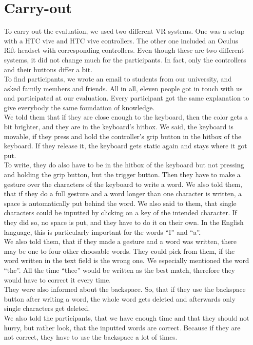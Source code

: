 \section{Carry-out}
To carry out the evaluation, we used two different VR systems. One was a setup with a HTC vive and HTC vive controllers. The other one included an Oculus Rift headset with corresponding controllers. Even though these are two different systems, it did not change much for the participants. In fact, only the controllers and their buttons differ a bit.\\
To find participants, we wrote an email to students from our university, and asked family members and friends. All in all, eleven people got in touch with us and participated at our evaluation. Every participant got the same explanation to give everybody the same foundation of knowledge.\\
We told them that if they are close enough to the keyboard, then the color gets a bit brighter, and they are in the keyboard's hitbox. We said, the keyboard is movable, if they press and hold the controller's grip button in the hitbox of the keyboard. If they release it, the keyboard gets static again and stays where it got put.\\
To write, they do also have to be in the hitbox of the keyboard but not pressing and holding the grip button, but the trigger button. Then they have to make a gesture over the characters of the keyboard to write a word. We also told them, that if they do a full gesture and a word longer than one character is written, a space is automatically put behind the word. We also said to them, that single characters could be inputted by clicking on a key of the intended character. If they did so, no space is put, and they have to do it on their own. In the English language, this is particularly important for the words ``I'' and ``a''.\\
We also told them, that if they made a gesture and a word was written, there may be one to four other choosable words. They could pick from them, if the word written in the text field is the wrong one. We especially mentioned the word ``the''. All the time ``thee'' would be written as the best match, therefore they would have to correct it every time.\\
They were also informed about the backspace. So, that if they use the backspace button after writing a word, the whole word gets deleted and afterwards only single characters get deleted.\\
We also told the participants, that we have enough time and that they should not hurry, but rather look, that the inputted words are correct. Because if they are not correct, they have to use the backspace a lot of times.

